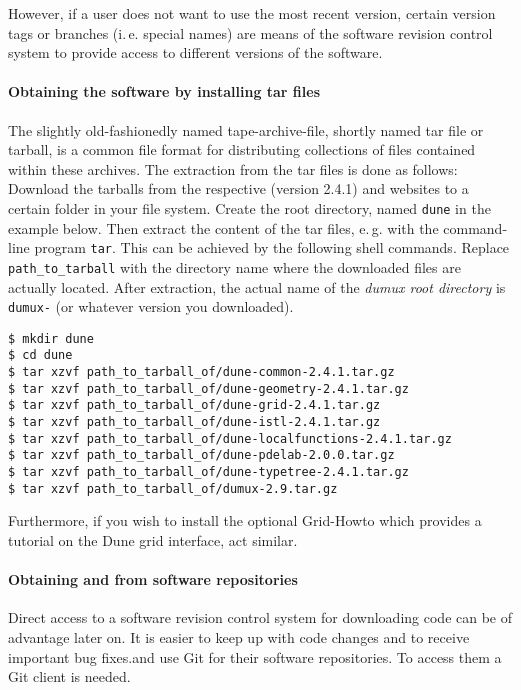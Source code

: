 However, if a user does not want to use the most recent version,
certain version tags or branches (i.\,e. special names) are means
of the software revision control system to provide access to different versions of the software.

\paragraph{Obtaining the software by installing tar files}
The slightly old-fashionedly named tape-archive-file, shortly named tar file or
tarball, is a common file format for distributing collections of files contained
within these archives.
The extraction from the tar files is done as follows:
Download the tarballs from the respective \Dune (version 2.4.1) and \Dumux websites
to a certain folder in your file system.
Create the {\Dune} root directory, named \texttt{dune} in the example below.
Then extract the content of the tar files, e.\,g. with the command-line program
\texttt{tar}.
This can be achieved by the following shell commands. Replace \texttt{path\_to\_tarball}
with the directory name where the downloaded files are actually located.
After extraction, the actual name of the \emph{dumux root directory} is \texttt{dumux-\DumuxVersion}
(or whatever version you downloaded).

\begin{lstlisting}[style=Bash]
$ mkdir dune
$ cd dune
$ tar xzvf path_to_tarball_of/dune-common-2.4.1.tar.gz
$ tar xzvf path_to_tarball_of/dune-geometry-2.4.1.tar.gz
$ tar xzvf path_to_tarball_of/dune-grid-2.4.1.tar.gz
$ tar xzvf path_to_tarball_of/dune-istl-2.4.1.tar.gz
$ tar xzvf path_to_tarball_of/dune-localfunctions-2.4.1.tar.gz
$ tar xzvf path_to_tarball_of/dune-pdelab-2.0.0.tar.gz
$ tar xzvf path_to_tarball_of/dune-typetree-2.4.1.tar.gz
$ tar xzvf path_to_tarball_of/dumux-2.9.tar.gz
\end{lstlisting}

Furthermore, if you wish to install the optional \Dune Grid-Howto which provides a tutorial
on the Dune grid interface, act similar.

\paragraph{Obtaining \Dune and \Dumux from software repositories}
Direct access to a software revision control system for downloading code can be of advantage later on.
It is easier to keep up with code changes and to receive important bug fixes.\Dune and \Dumux use
Git for their software repositories. To access them a Git client is needed.

